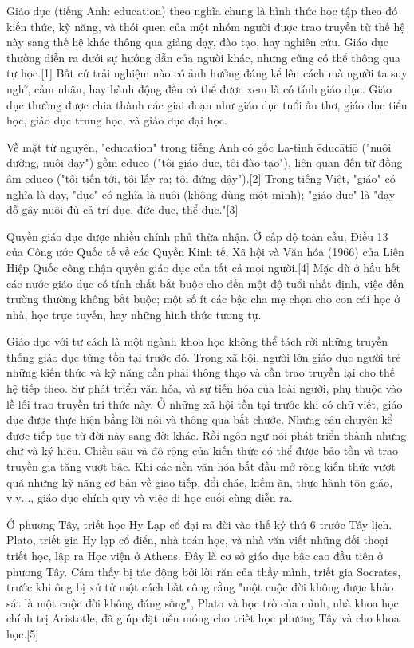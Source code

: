 \documentclass[../thesis.tex]{subfiles}
\begin{document}
Giáo dục\cite{wiki:giaoduc} (tiếng Anh: education) theo nghĩa chung là hình thức học tập theo đó kiến thức, kỹ năng, và thói quen của một nhóm người được trao truyền từ thế hệ này sang thế hệ khác thông qua giảng dạy, đào tạo, hay nghiên cứu. Giáo dục thường diễn ra dưới sự hướng dẫn của người khác, nhưng cũng có thể thông qua tự học.[1] Bất cứ trải nghiệm nào có ảnh hưởng đáng kể lên cách mà người ta suy nghĩ, cảm nhận, hay hành động đều có thể được xem là có tính giáo dục. Giáo dục thường được chia thành các giai đoạn như giáo dục tuổi ấu thơ, giáo dục tiểu học, giáo dục trung học, và giáo dục đại học.

Về mặt từ nguyên, "education" trong tiếng Anh có gốc La-tinh ēducātiō ("nuôi dưỡng, nuôi dạy") gồm ēdūcō ("tôi giáo dục, tôi đào tạo"), liên quan đến từ đồng âm ēdūcō ("tôi tiến tới, tôi lấy ra; tôi đứng dậy").[2] Trong tiếng Việt, "giáo" có nghĩa là dạy, "dục" có nghĩa là nuôi (không dùng một mình); "giáo dục" là "dạy dỗ gây nuôi đủ cả trí-dục, đức-dục, thể-dục."[3]

Quyền giáo dục được nhiều chính phủ thừa nhận. Ở cấp độ toàn cầu, Điều 13 của Công ước Quốc tế về các Quyền Kinh tế, Xã hội và Văn hóa (1966) của Liên Hiệp Quốc công nhận quyền giáo dục của tất cả mọi người.[4] Mặc dù ở hầu hết các nước giáo dục có tính chất bắt buộc cho đến một độ tuổi nhất định, việc đến trường thường không bắt buộc; một số ít các bậc cha mẹ chọn cho con cái học ở nhà, học trực tuyến, hay những hình thức tương tự.

Giáo dục với tư cách là một ngành khoa học không thể tách rời những truyền thống giáo dục từng tồn tại trước đó. Trong xã hội, người lớn giáo dục người trẻ những kiến thức và kỹ năng cần phải thông thạo và cần trao truyền lại cho thế hệ tiếp theo. Sự phát triển văn hóa, và sự tiến hóa của loài người, phụ thuộc vào lề lối trao truyền tri thức này. Ở những xã hội tồn tại trước khi có chữ viết, giáo dục được thực hiện bằng lời nói và thông qua bắt chước. Những câu chuyện kể được tiếp tục từ đời này sang đời khác. Rồi ngôn ngữ nói phát triển thành những chữ và ký hiệu. Chiều sâu và độ rộng của kiến thức có thể được bảo tồn và trao truyền gia tăng vượt bậc. Khi các nền văn hóa bắt đầu mở rộng kiến thức vượt quá những kỹ năng cơ bản về giao tiếp, đổi chác, kiếm ăn, thực hành tôn giáo, v.v..., giáo dục chính quy và việc đi học cuối cùng diễn ra.

Ở phương Tây, triết học Hy Lạp cổ đại ra đời vào thế kỷ thứ 6 trước Tây lịch. Plato, triết gia Hy lạp cổ điển, nhà toán học, và nhà văn viết những đối thoại triết học, lập ra Học viện ở Athens. Đây là cơ sở giáo dục bậc cao đầu tiên ở phương Tây. Cảm thấy bị tác động bởi lời răn của thầy mình, triết gia Socrates, trước khi ông bị xử tử một cách bất công rằng "một cuộc đời không được khảo sát là một cuộc đời không đáng sống", Plato và học trò của mình, nhà khoa học chính trị Aristotle, đã giúp đặt nền móng cho triết học phương Tây và cho khoa học.[5]
\end{document}
